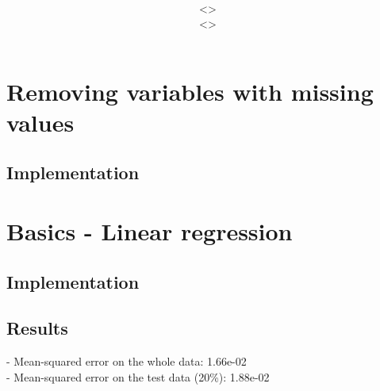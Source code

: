 \documentclass[12pt,a4paper]{article}
\title{\vspace{2in}\textmd{\hmwkClass\\\textbf{\hmwkTitle}}\\\normalsize\vspace{0.1in}\small{\hmwkDueDate}\\\vspace{4in}}
\date{}
\author{\textbf{\hmwkAuthorNameA} $\;$<\texttt{\href{mailto:laane2@illinois.edu}{\hmwkAuthorEmailA}}>\\\textbf{\hmwkAuthorNameB} $\;$<\texttt{\href{mailto:ruizcep2@illinois.edu}{\hmwkAuthorEmailB}}>}
\begin{document}
\begin{singlespace}

\begin{titlepage}
\maketitle
\thispagestyle{empty}
\end{titlepage}

\tableofcontents
\newpage


\clearpage

\section{Removing variables with missing values}
\subsection{Implementation}


\section{Basics - Linear regression}
\subsection{Implementation}


\subsection{Results}
 - Mean-squared error on the whole data: 1.66e-02 \\
 - Mean-squared error on the test data (20\%): 1.88e-02

\newpage

\end{singlespace}
\end{document}
